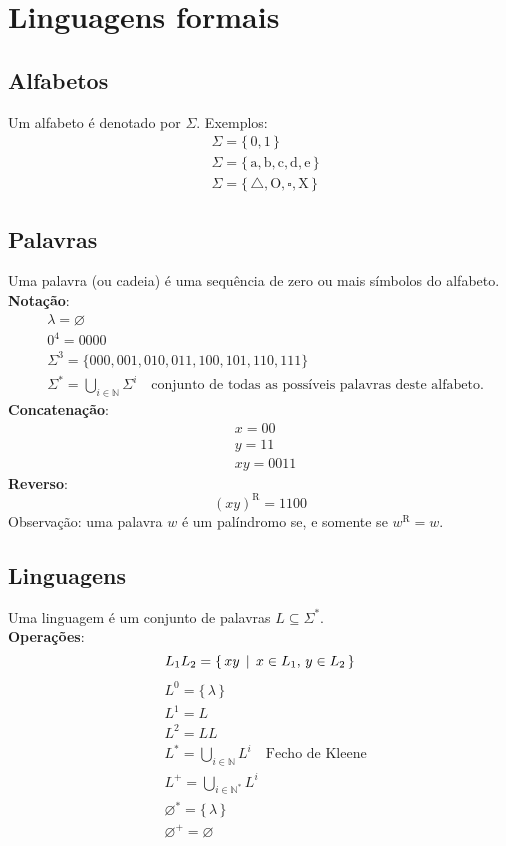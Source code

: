 \documentclass[11pt]{article}
\date{\today}
\title{}
\begin{document}
\section{Linguagens formais}
\label{sec:org99c85d6}
\subsection{Alfabetos}
\label{sec:org3b1f744}
Um alfabeto é denotado por \(\Sigma\). Exemplos:
\begin{align*}
  & \Sigma = \{\, 0, 1 \,\} \\
  & \Sigma = \{\, \text{a}, \text{b}, \text{c}, \text{d}, \text{e} \,\} \\
  & \Sigma = \{\, \triangle, \text{O}, \square, \text{X} \,\}
\end{align*}
\subsection{Palavras}
\label{sec:org17cde05}
Uma palavra (ou cadeia) é uma sequência de zero ou mais símbolos do alfabeto.
\\[5pt]
\textbf{Notação}:
\begin{align*}
  & \lambda = \varnothing \\
  & 0^4 = 0000 \\
  & \Sigma^3 = \{ 000, 001, 010, 011, 100, 101, 110, 111 \} \\
  & \Sigma^* = \bigcup_{i \in \mathbb{N}} \Sigma^i \quad \text{conjunto de todas as possíveis palavras deste alfabeto.}
\end{align*}
\textbf{Concatenação}:
\begin{align*}
  & x = 00 \\
  & y = 11 \\
  & xy = 0011
\end{align*}
\textbf{Reverso}:
\[
  (xy)^{\text{R}} = 1100
\]
Observação: uma palavra \(w\) é um palíndromo se, e somente se \(w^{\text{R}} = w\).
\subsection{Linguagens}
\label{sec:org75c1770}
Uma linguagem é um conjunto de palavras \(L \subseteq \Sigma^*\). \\[5pt]
\textbf{Operações}:
\[ L_1L_2 = \{\, xy \,\mid\, x \in L_1,\, y \in L_2 \,\} \\ \]
\begin{align*}
  & L^0 = \{\, \lambda \,\} \\
  & L^1 = L \\
  & L^2 = LL \\
  & L^* = \bigcup_{i \in \mathbb{N}} L^i \quad \text{Fecho de Kleene} \\
  & L^+ = \bigcup_{i \in \mathbb{N}^*} L^i \\
  & \varnothing^* = \{\, \lambda \,\} \\
  & \varnothing^+ = \varnothing
\end{align*}
\end{document}
